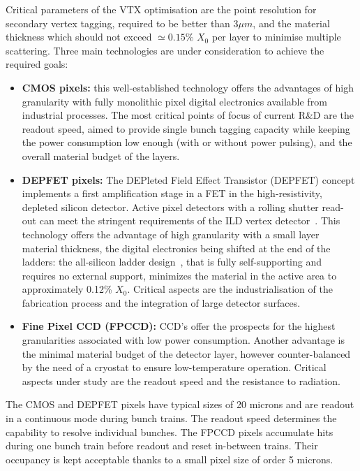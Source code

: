 Critical parameters of the VTX optimisation are the point resolution for secondary vertex tagging, required to be better than 3$\mu m$, and the material thickness which should not exceed $\simeq 0.15\%$ $X_0$ per layer to minimise multiple scattering. Three main technologies are under consideration to achieve the required goals:
\begin{itemize}
    \item {\bf CMOS pixels:} this well-established technology offers the advantages of high granularity with fully monolithic pixel digital electronics available from industrial processes. The most critical points of focus of current R\&D are the readout speed, aimed to provide single bunch tagging capacity while keeping the power consumption low enough (with or without power pulsing), and the overall material budget of the layers.
    \item {\bf DEPFET pixels:} The DEPleted Field Effect Transistor (DEPFET) concept implements a first amplification stage in a FET in the high-resistivity, depleted silicon detector. Active pixel detectors with a rolling shutter read-out can meet the stringent requirements of the ILD vertex detector~\cite{Alonso:2012ss,Richter:2003dn}. This technology offers the advantage of high granularity with a small layer material thickness, the digital electronics being shifted at the end of the ladders: the all-silicon ladder design~\cite{Andricek:2004cj}, that is fully self-supporting and requires no external support, minimizes the material in the active area to approximately 0.12\% $X_{0}$. Critical aspects are the industrialisation of the fabrication process and the integration of large detector surfaces.
    \item{\bf Fine Pixel CCD (FPCCD):} CCD's offer the prospects for the highest granularities associated with low power consumption. Another advantage is the minimal material budget of the detector layer, however counter-balanced by the need of a cryostat to ensure low-temperature operation. Critical aspects under study are the readout speed and the resistance to radiation.  
\end{itemize}

\vspace{0.5cm}
The CMOS and DEPFET pixels have typical sizes of 20 microns and are readout in a continuous mode during bunch trains. The readout speed determines the capability to resolve individual bunches. The FPCCD pixels accumulate hits during one bunch train before readout and reset in-between trains. Their occupancy is kept acceptable thanks to a small pixel size of order 5 microns.  


